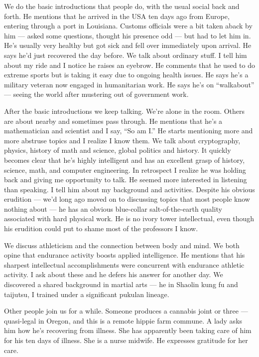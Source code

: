 We do the basic introductions that people do, with the usual social back and forth. He mentions that he arrived in the USA ten days ago from Europe, entering through a port in Louisiana. Customs officials were a bit taken aback by him --- asked some questions, thought his presence odd --- but had to let him in. He's usually very healthy but got sick and fell over immediately upon arrival. He says he'd just recovered the day before. We talk about ordinary stuff. I tell him about my ride and I notice he raises an eyebrow. He comments that he used to do extreme sports but is taking it easy due to ongoing health issues. He says he's a military veteran now engaged in humanitarian work. He says he's on ``walkabout'' --- seeing the world after mustering out of government work.

After the basic introductions we keep talking. We're alone in the room. Others are about nearby and sometimes pass through. He mentions that he's a mathematician and scientist and I say, ``So am I.'' He starts mentioning more and more abstruse topics and I realize I know them. We talk about cryptography, physics, history of math and science, global politics and history. It quickly becomes clear that he's highly intelligent and has an excellent grasp of history, science, math, and computer engineering. In retrospect I realize he was holding back and giving me opportunity to talk. He seemed more interested in listening than speaking. I tell him about my background and activities. Despite his obvious erudition --- we'd long ago moved on to discussing topics that most people know nothing about --- he has an obvious blue-collar salt-of-the-earth quality associated with hard physical work. He is no ivory tower intellectual, even though his erudition could put to shame most of the professors I know.

We discuss athleticism and the connection between body and mind. We both opine that endurance activity boosts applied intelligence. He mentions that his sharpest intellectual accomplishments were concurrent with endurance athletic activity. I ask about these and he defers his answer for another day. We discovered a shared background in martial arts --- he in Shaolin kung fu and taijutsu, I trained under a significant pukulan lineage.

Other people join us for a while. Someone produces a cannabis joint or three --- quasi-legal in Oregon, and this is a remote hippie farm commune. A lady asks him how he's recovering from illness. She has apparently been taking care of him for his ten days of illness. She is a nurse midwife. He expresses gratitude for her care.

